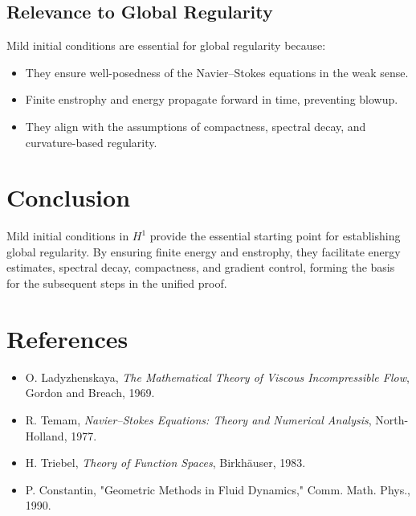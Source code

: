 \documentclass[12pt]{article}
\theoremstyle{definition}
\begin{document}
\subsection{Relevance to Global Regularity}
Mild initial conditions are essential for global regularity because:
\begin{itemize}
    \item They ensure well-posedness of the Navier--Stokes equations in the weak sense.
    \item Finite enstrophy and energy propagate forward in time, preventing blowup.
    \item They align with the assumptions of compactness, spectral decay, and curvature-based regularity.
\end{itemize}

\section*{Conclusion}
Mild initial conditions in $H^1$ provide the essential starting point for establishing global regularity. By ensuring finite energy and enstrophy, they facilitate energy estimates, spectral decay, compactness, and gradient control, forming the basis for the subsequent steps in the unified proof.

\section*{References}
\begin{itemize}
    \item O. Ladyzhenskaya, \emph{The Mathematical Theory of Viscous Incompressible Flow}, Gordon and Breach, 1969.
    \item R. Temam, \emph{Navier--Stokes Equations: Theory and Numerical Analysis}, North-Holland, 1977.
    \item H. Triebel, \emph{Theory of Function Spaces}, Birkh\"auser, 1983.
    \item P. Constantin, "Geometric Methods in Fluid Dynamics," Comm. Math. Phys., 1990.
\end{itemize}
\end{document}
